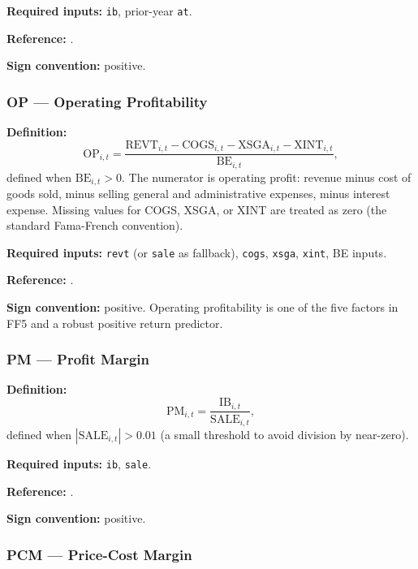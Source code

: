 \textbf{Required inputs:} \texttt{ib}, prior-year \texttt{at}.

\textbf{Reference:} \cite{HouXueZhang2015,BalakrishnanBartovFaurel2010}.

\textbf{Sign convention:} positive.

\subsubsection{OP --- Operating Profitability}

\textbf{Definition:}
\begin{equation}
\mathrm{OP}_{i,t} = \frac{\mathrm{REVT}_{i,t} - \mathrm{COGS}_{i,t}
                          - \mathrm{XSGA}_{i,t} - \mathrm{XINT}_{i,t}}
                          {\mathrm{BE}_{i,t}},
\label{eq:op}
\end{equation}
defined when $\mathrm{BE}_{i,t} > 0$. The numerator is
operating profit: revenue minus cost of goods sold, minus selling
general and administrative expenses, minus interest expense. Missing
values for COGS, XSGA, or XINT are treated as zero (the standard
Fama-French convention).

\textbf{Required inputs:} \texttt{revt} (or \texttt{sale} as fallback),
\texttt{cogs}, \texttt{xsga}, \texttt{xint}, BE inputs.

\textbf{Reference:} \cite{FamaFrench2015}.

\textbf{Sign convention:} positive. Operating profitability is one of
the five factors in FF5 and a robust positive return predictor.

\subsubsection{PM --- Profit Margin}

\textbf{Definition:}
\begin{equation}
\mathrm{PM}_{i,t} = \frac{\mathrm{IB}_{i,t}}{\mathrm{SALE}_{i,t}},
\label{eq:pm}
\end{equation}
defined when $|\mathrm{SALE}_{i,t}| > 0.01$ (a small threshold to avoid
division by near-zero).

\textbf{Required inputs:} \texttt{ib}, \texttt{sale}.

\textbf{Reference:} \cite{SoliFridson1995}.

\textbf{Sign convention:} positive.

\subsubsection{PCM --- Price-Cost Margin}

